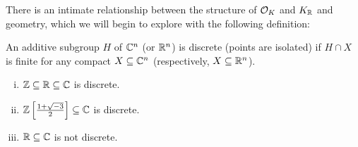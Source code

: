 There is an intimate relationship between the structure of $\mathcal{O}_K$ and $K_{\mathbb{R}}$ and geometry, which we will begin to explore with the following definition:


\begin{dfn}[Discrete]
An additive subgroup $H$ of $\mathbb{C}^n$ (or $\mathbb{R}^n$) is discrete (points are isolated) if $H \cap X$ is finite for any compact $X \subseteq \mathbb{C}^n$ (respectively, $X \subseteq \mathbb{R}^n$). 
\end{dfn}


\begin{ex} \hfill
	\begin{enumerate}[(i)]
	\item $\mathbb{Z} \subseteq \mathbb{R} \subseteq \mathbb{C}$ is discrete.
	\item $\mathbb{Z}\left[\frac{1 + \sqrt{-3}}{2}\right] \subseteq \mathbb{C}$ is discrete.
	\item $\mathbb{R} \subseteq \mathbb{C}$ is not discrete. \xqed \pskip
	\end{enumerate} 
\end{ex}


